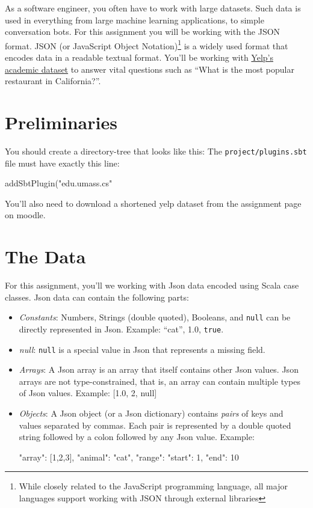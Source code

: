 
\noindent As a software engineer, you often have to work with large datasets.
Such data is used in everything from large machine learning applications, to
simple conversation bots. For this assignment you will be working
with the JSON format. JSON (or JavaScript Object Notation)\footnote{While
closely related to the JavaScript programming language, all major languages
support working with JSON through external libraries} is a widely used format
that encodes data in a readable textual format. You'll be working with
\href{https://www.yelp.com/dataset}{Yelp's academic dataset} to answer vital
questions such as ``What is the most popular restaurant in California?''.

\section{Preliminaries}
You should create a directory-tree that looks like this:
The \texttt{project/plugins.sbt} file must have exactly this line:
\begin{scalacode}
addSbtPlugin("edu.umass.cs" %
\end{scalacode}

You'll also need to download a shortened yelp dataset from the assignment page
on moodle.

\section{The Data}
For this assignment, you'll we working with Json data encoded using Scala case
classes. Json data can contain the following parts:
\begin{itemize}
    \item \textit{Constants}: Numbers, Strings (double quoted), Booleans, and
    \texttt{null} can be directly represented in Json. Example: ``cat'', 1.0,
    \texttt{true}.

    \item \textit{null}: \texttt{null} is a special value in Json that
    represents a missing field.

    \item \textit{Arrays}: A Json array is an array that itself contains other
    Json values. Json arrays are not type-constrained, that is, an array can
    contain multiple types of Json values. Example: [1.0, 2, null]

    \item \textit{Objects}: A Json object (or a Json dictionary) contains
    \textit{pairs} of keys and values separated by commas. Each pair is
    represented by a double quoted string followed by a colon followed by any
    Json value. Example:
    \begin{scalacode}
    {
        "array": [1,2,3],
        "animal": "cat",
        "range": { "start": 1, "end": 10 }
    }
    \end{scalacode}
\end{itemize}

